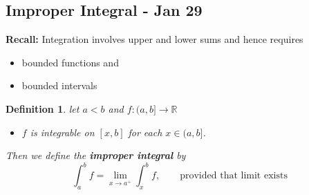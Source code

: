 \documentclass[12pt]{article}
\theoremstyle{plain}
\newtheorem{definition}{Definition}[subsection]
\newcommand{\mR}{{\mathbb{R}}}
\begin{document}
\newpage
\subsection{Improper Integral - Jan 29}
\textbf{Recall: }Integration involves upper and lower sums and hence
requires 
\begin{itemize}
	\item bounded functions and 
	\item bounded intervals
\end{itemize}

\begin{definition}
	let $a<b$ and $f:(a,b]\to \mR$
	\begin{itemize}
		\item $f$ is integrable on $[x,b]$ for each $x\in (a,b]$. 
	\end{itemize}
	Then we define the \textbf{improper integral} by 
	\[
		\int_a^b f = \lim_{x\to a^+} \int_x^b f, \qquad \text{provided that
		limit exists}
	\]
\end{definition}
\end{document}
